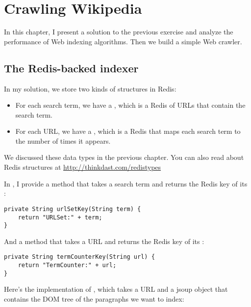 \documentclass[12pt]{book}
\theoremstyle{exercise}
\begin{document}
\chapter{Crawling Wikipedia}

In this chapter, I present a solution to the previous exercise and
analyze the performance of Web indexing algorithms. Then we build a
simple Web crawler.

\section{The Redis-backed indexer}
\label{redis-indexer}


In my solution, we store two kinds of structures in Redis:

\begin{itemize}

\item
  For each search term, we have a , which is a Redis 
  of URLs that contain the search term.

\item
  For each URL, we have a , which is a Redis 
  that maps each search term to the number of times it appears.

\end{itemize}

We discussed these data types in the previous chapter. You can also
read about Redis structures at \url{http://thinkdast.com/redistypes}


In , I provide a method that takes a search term
and returns the Redis key of its :

\begin{verbatim}
private String urlSetKey(String term) {
    return "URLSet:" + term;
}
\end{verbatim}

And a method that takes a URL and returns the Redis key of its
:

\begin{verbatim}
private String termCounterKey(String url) {
    return "TermCounter:" + url;
}
\end{verbatim}

Here's the implementation of , which takes a URL and a
jsoup  object that contains the DOM tree of the
paragraphs we want to index:
\end{document}

